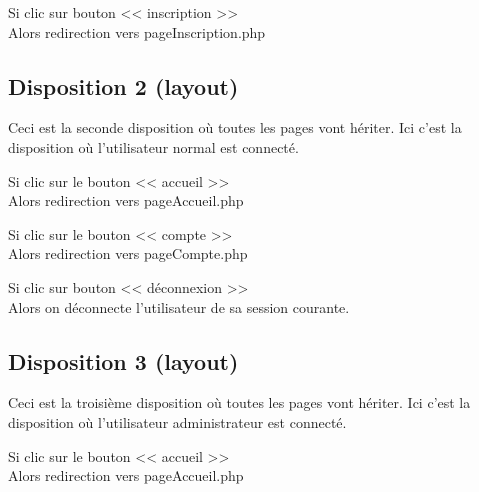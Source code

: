 		\begin{paragraphe}
			Si clic sur bouton << inscription >> \\
			Alors redirection vers pageInscription.php
		\end{paragraphe}


	\subsection{Disposition 2 (layout)}
	
		\begin{paragraphe}
			Ceci est la seconde disposition où toutes les pages vont hériter. Ici c'est la disposition où l'utilisateur normal est connecté.
		\end{paragraphe}

		\begin{paragraphe}
			Si clic sur le bouton << accueil >> \\
			Alors redirection vers pageAccueil.php
		\end{paragraphe}

		\begin{paragraphe}
			Si clic sur le bouton << compte >> \\
			Alors redirection vers pageCompte.php
		\end{paragraphe}
		
		\begin{paragraphe}
			Si clic sur bouton << déconnexion >> \\
			Alors on déconnecte l'utilisateur de sa session courante.
		\end{paragraphe}


	\subsection{Disposition 3 (layout)}
	
		\begin{paragraphe}
			Ceci est la troisième disposition où toutes les pages vont hériter. Ici c'est la disposition où l'utilisateur administrateur est connecté.
		\end{paragraphe}

		\begin{paragraphe}
			Si clic sur le bouton << accueil >> \\
			Alors redirection vers pageAccueil.php
		\end{paragraphe}

